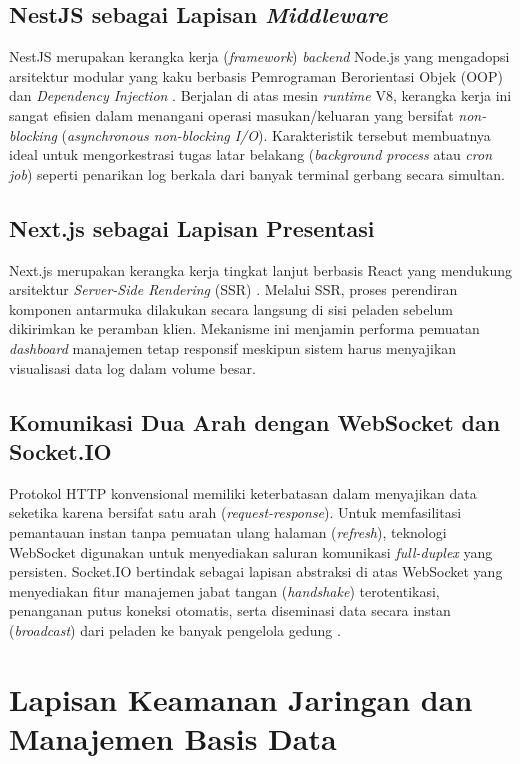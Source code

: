 \subsection{NestJS sebagai Lapisan \textit{Middleware}}
NestJS merupakan kerangka kerja (\textit{framework}) \textit{backend} Node.js yang mengadopsi arsitektur modular yang kaku berbasis Pemrograman Berorientasi Objek (OOP) dan \textit{Dependency Injection} \autocite{nestjs_docs}. Berjalan di atas mesin \textit{runtime} V8, kerangka kerja ini sangat efisien dalam menangani operasi masukan/keluaran yang bersifat \textit{non-blocking} (\textit{asynchronous non-blocking I/O}). Karakteristik tersebut membuatnya ideal untuk mengorkestrasi tugas latar belakang (\textit{background process} atau \textit{cron job}) seperti penarikan log berkala dari banyak terminal gerbang secara simultan.

\subsection{Next.js sebagai Lapisan Presentasi}
Next.js merupakan kerangka kerja tingkat lanjut berbasis React yang mendukung arsitektur \textit{Server-Side Rendering} (SSR) \autocite{nextjs_docs}. Melalui SSR, proses perendiran komponen antarmuka dilakukan secara langsung di sisi peladen sebelum dikirimkan ke peramban klien. Mekanisme ini menjamin performa pemuatan \textit{dashboard} manajemen tetap responsif meskipun sistem harus menyajikan visualisasi data log dalam volume besar.

\subsection{Komunikasi Dua Arah dengan WebSocket dan Socket.IO}
Protokol HTTP konvensional memiliki keterbatasan dalam menyajikan data seketika karena bersifat satu arah (\textit{request-response}). Untuk memfasilitasi pemantauan instan tanpa pemuatan ulang halaman (\textit{refresh}), teknologi WebSocket digunakan untuk menyediakan saluran komunikasi \textit{full-duplex} yang persisten. Socket.IO bertindak sebagai lapisan abstraksi di atas WebSocket yang menyediakan fitur manajemen jabat tangan (\textit{handshake}) terotentikasi, penanganan putus koneksi otomatis, serta diseminasi data secara instan (\textit{broadcast}) dari peladen ke banyak pengelola gedung \autocite{socketio_docs}.

\section{Lapisan Keamanan Jaringan dan Manajemen Basis Data}

